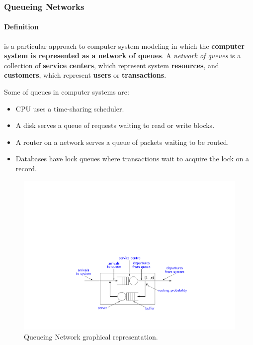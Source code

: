 \newpage

\subsubsection{Queueing Networks}\label{subsubsection: Queueing Networks}

\paragraph{Definition}

 is a particular approach to computer system modeling in which the \textbf{computer system is represented as a network of queues}. A \emph{network of queues} is a collection of \textbf{service centers}, which represent system \textbf{resources}, and \textbf{customers}, which represent \textbf{users} or \textbf{transactions}.\cite{lazowska1984quantitative}

\highspace
Some  of queues in computer systems are:
\begin{itemize}
	\item CPU uses a time-sharing scheduler.
	
	\item A disk serves a queue of requests waiting to read or write blocks.
	
	\item A router on a network serves a queue of packets waiting to be routed.
	
	\item Databases have lock queues where transactions wait to acquire the lock on a record.
\end{itemize}

\begin{figure}[!htp]
	\centering
	\includegraphics[width=\textwidth]{img/queueing-network-1.pdf}
	\caption{Queueing Network graphical representation.}
\end{figure}


